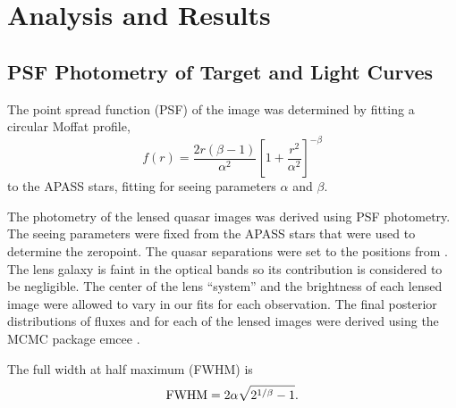 \documentclass[iop]{emulateapj}
\makeatletter
\newenvironment{inlinefigure}{
\def\@captype{figure}
\noindent\begin{minipage}{0.999\linewidth}\begin{center}}
{\end{center}\end{minipage}\smallskip}
\makeatother
\begin{document}


\section{Analysis and Results}

\subsection{PSF Photometry of Target and Light Curves}

The point spread function (PSF) of the image was determined by fitting
a circular Moffat profile,
\begin{equation}
f(r) = \frac{2 r (\beta - 1)}{\alpha^2} \left[ 1 + \frac{r^2}{\alpha^2}\right]^{-\beta}
\end{equation} to the APASS stars, fitting for seeing parameters $\alpha$ and $\beta$.
	
The photometry of the lensed quasar images was derived using PSF
photometry. The seeing parameters were fixed from the APASS stars that
were used to determine the zeropoint. The quasar separations were set
to the positions from \citet{Courbin11}. The lens galaxy is faint in
the optical bands so its contribution is considered to be
negligible. The center of the lens ``system'' and the brightness of
each lensed image were allowed to vary in our fits for each
observation.  The final posterior distributions of fluxes and for each
of the lensed images were derived using the MCMC package emcee
\citep{ForemanMackey13}.

The full width at half maximum (FWHM) is 
\begin{equation}
{\rm FWHM}=2\alpha\sqrt{2^{1/\beta}-1}. 
\end{equation}
\end{document}
